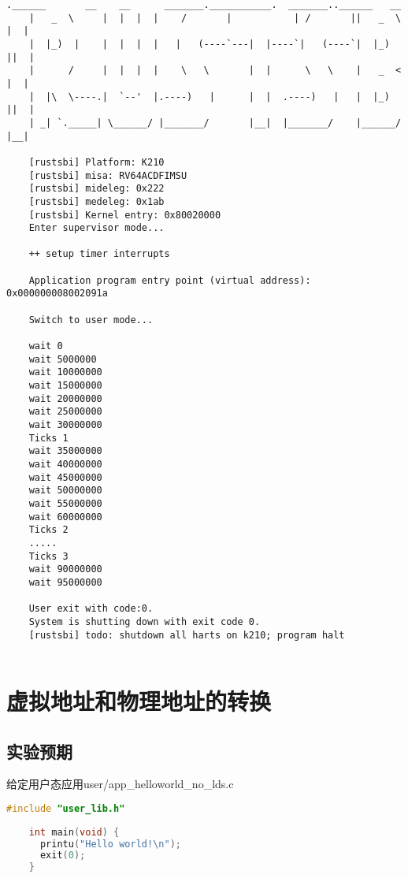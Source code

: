 \begin{lstlisting}[caption={lab3实验结果（移植K210后）}]
    .______       __    __      _______.___________.  _______..______   __
    |   _  \     |  |  |  |    /       |           | /       ||   _  \ |  |
    |  |_)  |    |  |  |  |   |   (----`---|  |----`|   (----`|  |_)  ||  |
    |      /     |  |  |  |    \   \       |  |      \   \    |   _  < |  |
    |  |\  \----.|  `--'  |.----)   |      |  |  .----)   |   |  |_)  ||  |
    | _| `._____| \______/ |_______/       |__|  |_______/    |______/ |__|
    
    [rustsbi] Platform: K210
    [rustsbi] misa: RV64ACDFIMSU
    [rustsbi] mideleg: 0x222
    [rustsbi] medeleg: 0x1ab
    [rustsbi] Kernel entry: 0x80020000
    Enter supervisor mode...
    
    ++ setup timer interrupts
    
    Application program entry point (virtual address): 0x000000008002091a
    
    Switch to user mode...
    
    wait 0
    wait 5000000
    wait 10000000
    wait 15000000
    wait 20000000
    wait 25000000
    wait 30000000
    Ticks 1
    wait 35000000
    wait 40000000
    wait 45000000
    wait 50000000
    wait 55000000
    wait 60000000
    Ticks 2
    .....
    Ticks 3
    wait 90000000
    wait 95000000
    
    User exit with code:0.
    System is shutting down with exit code 0.
    [rustsbi] todo: shutdown all harts on k210; program halt
       
\end{lstlisting}

\section{虚拟地址和物理地址的转换}

\subsection{实验预期}

给定用户态应用user/app\_helloworld\_no\_lds.c

\begin{lstlisting}[caption={用户态应用app\_helloworld\_no\_lds.c}, label={lst:app_helloworld_no_lds}, language=C]
    #include "user_lib.h"
    
    int main(void) {
      printu("Hello world!\n");
      exit(0);
    }    
\end{lstlisting}

